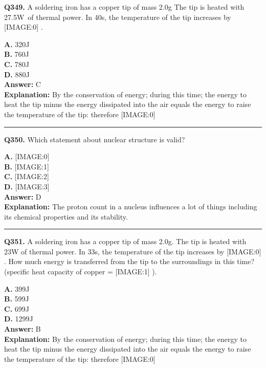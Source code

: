 \documentclass[12pt]{article}
\begin{document}
\noindent
\textbf{Q349.} A soldering iron has a copper tip of mass 2.0g
The tip is heated with 27.5W of thermal power. In 40s, the temperature of the tip increases by
[IMAGE:0]
.



\textbf{A.} 320J \\
\textbf{B.} 760J \\
\textbf{C.} 780J \\
\textbf{D.} 880J \\

\textbf{Answer:} C \\
\textbf{Explanation:} By the conservation of energy; during this time; the energy to heat the tip minus the energy dissipated into the air equals the energy to raise the temperature of the tip: therefore
[IMAGE:0]

\hrule
\vspace{1em}


\noindent
\textbf{Q350.} Which statement about nuclear structure is valid?



\textbf{A.} [IMAGE:0] \\
\textbf{B.} [IMAGE:1] \\
\textbf{C.} [IMAGE:2] \\
\textbf{D.} [IMAGE:3] \\

\textbf{Answer:} D \\
\textbf{Explanation:} The proton count in a nucleus influences a lot of things including its chemical properties and its stability.

\hrule
\vspace{1em}


\noindent
\textbf{Q351.} A soldering iron has a copper tip of mass 2.0g.
The tip is heated with 23W of thermal power. In 33s, the temperature of the tip increases by
[IMAGE:0]
.
How much energy is transferred from the tip to the surroundings in this time? (specific heat capacity of copper =
[IMAGE:1]
).



\textbf{A.} 399J \\
\textbf{B.} 599J \\
\textbf{C.} 699J \\
\textbf{D.} 1299J \\

\textbf{Answer:} B \\
\textbf{Explanation:} By the conservation of energy; during this time; the energy to heat the tip minus the energy dissipated into the air equals the energy to raise the temperature of the tip: therefore
[IMAGE:0]
\end{document}
